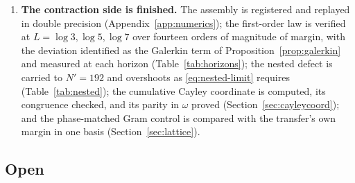\begin{enumerate}
deformation inward; what blocks a geometric realization of that deformation is
that the offset $2\omega$ is a dimension, hence quantized
(Remark~\ref{rem:integer}).
\item \textbf{The contraction side is finished.} The assembly is registered and
replayed in double precision (Appendix~\ref{app:numerics}); the first-order law
is verified at $L=\log3,\log5,\log7$ over fourteen orders of magnitude of margin,
with the deviation identified as the Galerkin term of
Proposition~\ref{prop:galerkin} and measured at each horizon
(Table~\ref{tab:horizons}); the nested defect is carried to $N'=192$ and
overshoots as \eqref{eq:nested-limit} requires (Table~\ref{tab:nested}); the
cumulative Cayley coordinate is computed, its congruence checked, and its parity
in $\omega$ proved (Section~\ref{sec:cayleycoord}); and the phase-matched Gram
control is compared with the transfer's own margin in one basis
(Section~\ref{sec:lattice}).
\end{enumerate}

\subsection{Open}

